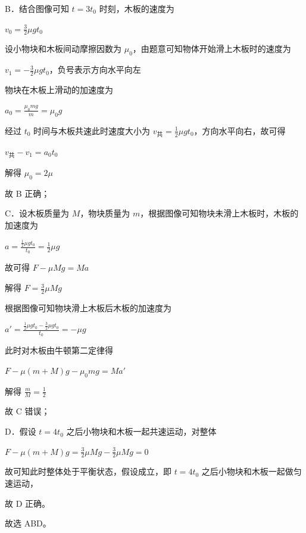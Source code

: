 \documentclass[\gkver]{gaokaozhenti}
\begin{document}
\begin{enumerate}
{B．结合图像可知 $t = 3t_{0}$ 时刻，木板的速度为

$v_{0} = \frac{3}{2}\mu gt_{0}$

设小物块和木板间动摩擦因数为 $\mu_{0}$，由题意可知物体开始滑上木板时的速度为

$v_{1} = -\frac{3}{2}\mu gt_{0}$，负号表示方向水平向左

物块在木板上滑动的加速度为

$a_{0} = \frac{\mu_{0}mg}{m} = \mu_{0}g$

经过 $t_{0}$ 时间与木板共速此时速度大小为 $v_{\text{共}} = \frac{1}{2}\mu gt_{0}$，方向水平向右，故可得

$v_{\text{共}} - v_{1} = a_{0}t_{0}$

解得 $\mu_{0} = 2\mu$

故 B 正确；

C．设木板质量为 $M$，物块质量为 $m$，根据图像可知物块未滑上木板时，木板的加速度为

$a = \frac{\frac{1}{2}\mu gt_{0}}{t_{0}} = \frac{1}{2}\mu g$

故可得 $F - \mu Mg = Ma$

解得 $F = \frac{3}{2}\mu Mg$

根据图像可知物块滑上木板后木板的加速度为

$a' = \frac{\frac{1}{2}\mu gt_{0} - \frac{3}{2}\mu gt_{0}}{t_{0}} = -\mu g$

此时对木板由牛顿第二定律得

$F - \mu (m + M)g - \mu_{0}mg = Ma'$

解得 $\frac{m}{M} = \frac{1}{2}$

故 C 错误；

D．假设 $t = 4t_{0}$ 之后小物块和木板一起共速运动，对整体

$F - \mu (m + M)g = \frac{3}{2}\mu Mg - \frac{3}{2}\mu Mg = 0$

故可知此时整体处于平衡状态，假设成立，即 $t = 4t_{0}$ 之后小物块和木板一起做匀速运动，

故 D 正确。

故选 ABD。
}


\end{enumerate}
\end{document}
